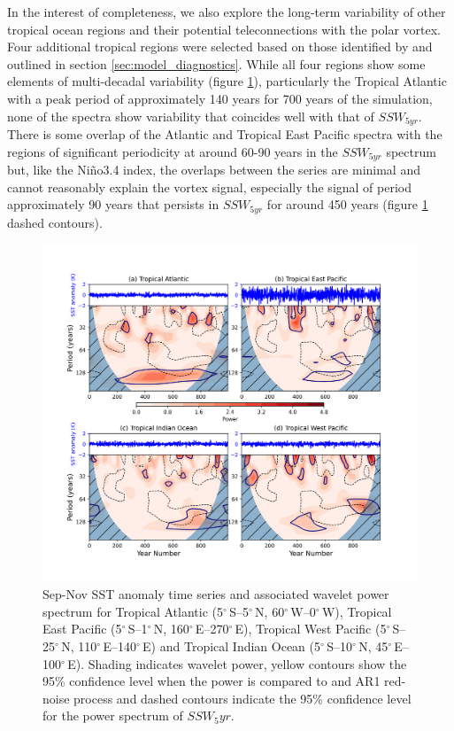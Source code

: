 In the interest of completeness, we also explore the long-term variability of other tropical ocean regions and their potential teleconnections with the polar vortex. Four additional tropical regions were selected based on those identified by \cite{scaifeTropical2017b} and outlined in section \ref{sec:model_diagnostics}. While all four regions show some elements of multi-decadal variability (figure \ref{fig:tropical_SST_wavelet}), particularly the Tropical Atlantic with a peak period of approximately 140 years for 700 years of the simulation, none of the spectra show variability that coincides well with that of $SSW_{5yr}$. There is some overlap of the Atlantic and Tropical East Pacific spectra with the regions of significant periodicity at around 60-90 years in the $SSW_{5yr}$ spectrum but, like the Ni\~{n}o3.4 index, the overlaps between the series are minimal and cannot reasonably explain the vortex signal, especially the signal of period approximately 90 years that persists in $SSW_{5yr}$ for around 450 years (figure \ref{fig:tropical_SST_wavelet} dashed contours).

\begin{figure}[h!]
\begin{center}
\noindent\includegraphics[width = 0.8\linewidth]{Figures/Figures-origins/SSTs_tropical_wavelet.png}
\caption{Sep-Nov SST anomaly time series and associated wavelet power spectrum for Tropical Atlantic (5$^{\circ}$\,S–5$^{\circ}$\,N, 60$^{\circ}$\,W–0$^{\circ}$\,W), Tropical East Pacific (5$^{\circ}$\,S–1$^{\circ}$\,N, 160$^{\circ}$\,E–270$^{\circ}$\,E), Tropical West Pacific (5$^{\circ}$\,S–25$^{\circ}$\,N, 110$^{\circ}$\,E–140$^{\circ}$\,E) and Tropical Indian Ocean (5$^{\circ}$\,S–10$^{\circ}$\,N, 45$^{\circ}$\,E–100$^{\circ}$\,E). Shading indicates wavelet power, yellow contours show the 95\% confidence level when the power is compared to and AR1 red-noise process and dashed contours indicate the 95\% confidence level for the power spectrum of $SSW_5yr$.}
\label{fig:tropical_SST_wavelet}
\end{center}
\end{figure}

